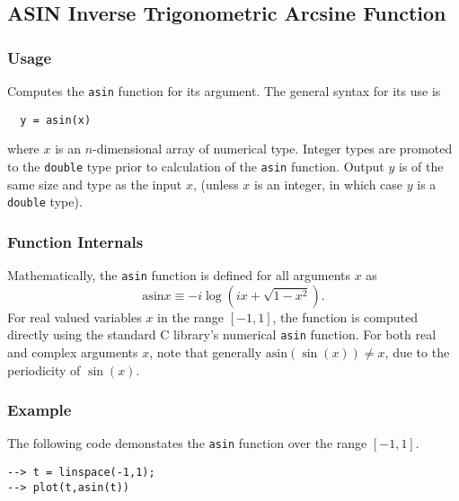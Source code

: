 %
%
%
\subsection{ASIN Inverse Trigonometric Arcsine Function}
\subsubsection{Usage}
Computes the \verb|asin| function for its argument.  The general
syntax for its use is
\begin{verbatim}
  y = asin(x)
\end{verbatim}
where $x$ is an $n$-dimensional array of numerical type.
Integer types are promoted to the \verb|double| type prior to
calculation of the \verb|asin| function.  Output $y$ is of the
same size and type as the input $x$, (unless $x$ is an
integer, in which case $y$ is a \verb|double| type).  
\subsubsection{Function Internals}
Mathematically, the \verb|asin| function is defined for all 
arguments $x$ as
\[ 
   \mathrm{asin} x \equiv - i \log \left(i x + 
   \sqrt{1-x^2}\right).
\]
For real valued variables $x$ in the range $[-1,1]$, the function is
computed directly using the standard C library's numerical \verb|asin|
function. For both real and complex arguments $x$, note that generally
$\mathrm{asin}(\sin(x)) \neq x$, due to the periodicity of $\sin(x)$.
\subsubsection{Example}
The following code demonstates the \verb|asin| function over the range 
$[-1,1]$.
\begin{verbatim}
--> t = linspace(-1,1);
--> plot(t,asin(t))
\end{verbatim}
